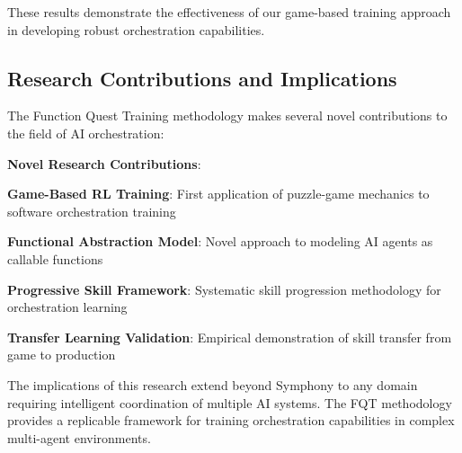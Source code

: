 These results demonstrate the effectiveness of our game-based training approach in developing robust orchestration capabilities.

\subsection*{Research Contributions and Implications}

The Function Quest Training methodology makes several novel contributions to the field of AI orchestration:

\begin{successbox}
\textbf{Novel Research Contributions}:
\begin{compactlist}
    \item \textbf{Game-Based RL Training}: First application of puzzle-game mechanics to software orchestration training
    \item \textbf{Functional Abstraction Model}: Novel approach to modeling AI agents as callable functions
    \item \textbf{Progressive Skill Framework}: Systematic skill progression methodology for orchestration learning
    \item \textbf{Transfer Learning Validation}: Empirical demonstration of skill transfer from game to production
\end{compactlist}
\end{successbox}

The implications of this research extend beyond Symphony to any domain requiring intelligent coordination of multiple AI systems. The FQT methodology provides a replicable framework for training orchestration capabilities in complex multi-agent environments.
